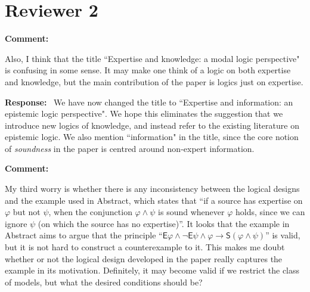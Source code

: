 \documentclass[12pt]{article}
\newenvironment{comment}{
    \noindent\textbf{Comment:}\
    \em
}{\vspace{5mm}}
\newenvironment{response}{
    \noindent\textbf{Response:}\
}{\vspace{5mm}}
\renewcommand{\phi}{\varphi}
\newcommand{\E}{\mathsf{E}}
\renewcommand{\S}{\mathsf{S}}
\begin{document}
\section*{Reviewer 2}

\begin{comment}
     Also, I think that the title ``Expertise and knowledge: a modal logic
     perspective" is confusing in some sense. It may make one think of a logic
     on both expertise and knowledge, but the main contribution of the paper is
     logics just on expertise.
\end{comment}

\begin{response}
    We have now changed the title to ``Expertise and information: an epistemic
    logic perspective". We hope this eliminates the suggestion that we
    introduce new logics of knowledge, and instead refer to the existing
    literature on epistemic logic. We also mention ``information" in the
    title, since the core notion of \emph{soundness} in the paper is centred
    around non-expert information.
\end{response}

\begin{comment}
    My third worry is whether there is any inconsistency between the logical
    designs and the example used in Abstract, which states that ``if a source
    has expertise on $\phi$ but not $\psi$, when the conjunction $\phi \land
    \psi$ is sound whenever $\phi$ holds, since we can ignore $\psi$ (on which
    the source has no expertise)''. It looks that the example in Abstract aims
    to argue that the principle ``$\E\phi \land \neg\E\psi \land \phi
    \rightarrow \S(\phi \land \psi)$'' is valid, but it is not hard to
    construct a counterexample to it. This makes me doubt whether or not the
    logical design developed in the paper really captures the example in its
    motivation. Definitely, it may become valid if we restrict the class of
    models, but what the desired conditions should be?
\end{comment}
\end{document}

